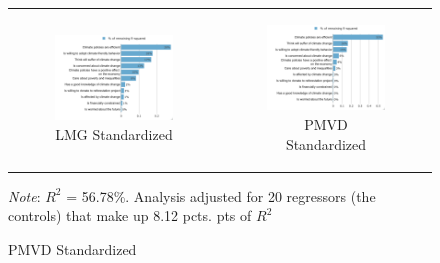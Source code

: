 \documentclass{article}
\begin{document}
\begin{figure}[h!]
\begin{center}
	\begin{tabular}{cc}
		\begin{subfigure}{0.5\textwidth}
		\caption{LMG Standardized}
			\includegraphics[width=\textwidth]{lmg_main_policies_standardized}
		\end{subfigure}&
		\begin{subfigure}{0.5\textwidth}
		\caption{PMVD Standardized}
			\includegraphics[width=\textwidth]{pmvd_main_policies_standardized}
		\end{subfigure}\\
	\end{tabular}
	{\footnotesize \textit{Note}:  $R^2$ = 56.78\%. Analysis adjusted for 20 regressors (the controls) that make up 8.12 pcts. pts of $R^2$}
\end{center}
\end{figure}
\end{document}
